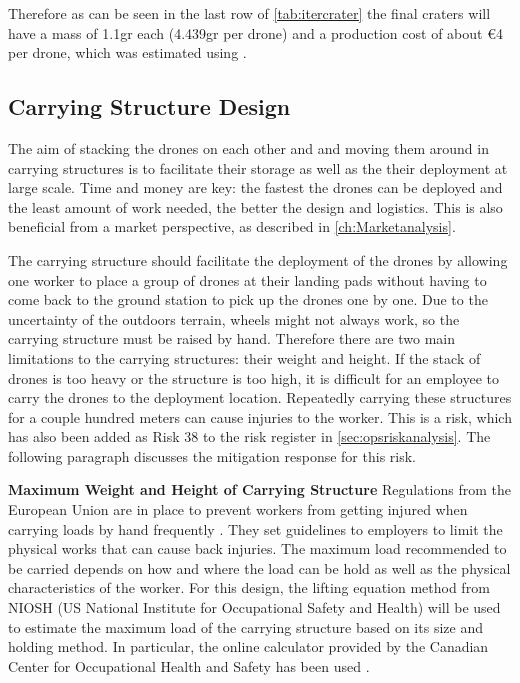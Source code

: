 Therefore as can be seen in the last row of \autoref{tab:itercrater} the final craters will have a mass of 1.1gr each (4.439gr per drone) and a production cost of about €4 per drone, which was estimated using \cite{materialbible}.

\subsection{Carrying Structure Design} \label{sub:carryingstruc}

The aim of stacking the drones on each other and and moving them around in carrying structures is to facilitate their storage as well as the their deployment at large scale. Time and money are key: the fastest the drones can be deployed and the least amount of work needed, the better the design and logistics. This is also beneficial from a market perspective, as described in \autoref{ch:Marketanalysis}.

The carrying structure should facilitate the deployment of the drones by allowing one worker to place a group of drones at their landing pads without having to come back to the ground station to pick up the drones one by one. Due to the uncertainty of the outdoors terrain, wheels might not always work, so the carrying structure must be raised by hand. Therefore there are two main limitations to the carrying structures: their weight and height. If the stack of drones is too heavy or the structure is too high, it is difficult for an employee to carry the drones to the deployment location. Repeatedly carrying these structures for a couple hundred meters can cause injuries to the worker. This is a risk, which has also been added as Risk 38 to the risk register in \autoref{sec:opsriskanalysis}. The following paragraph discusses the mitigation response for this risk.

\textbf{Maximum Weight and Height of Carrying Structure} \newline
Regulations from the European Union are in place to prevent workers from getting injured when carrying loads by hand frequently \cite{EUloads}. They set guidelines to employers to limit the physical works that can cause back injuries. The maximum load recommended to be carried depends on how and where the load can be hold as well as the physical characteristics of the worker. For this design, the lifting equation method from NIOSH (US National Institute for Occupational Safety and Health) will be used to estimate the maximum load of the carrying structure based on its size and holding method. In particular, the online calculator provided by the Canadian Center for Occupational Health and Safety has been used \cite{NIOSH}. 

